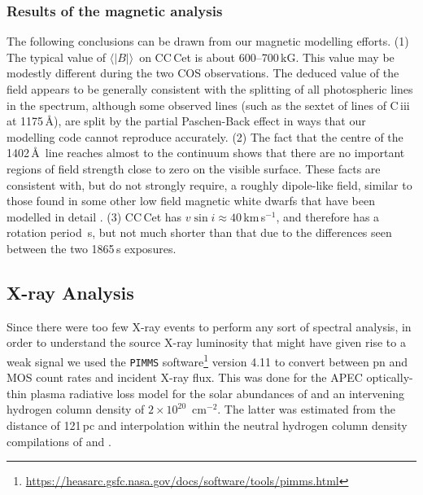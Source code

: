 \documentclass[fleqn,usenatbib]{mnras}
\newcommand{\bs}{\ensuremath{\langle \vert B \vert \rangle}}
\newcommand{\kms}{km\,s$^{-1}$}
\begin{document}
\subsubsection{Results of the magnetic analysis}

The following conclusions can be drawn from our magnetic modelling efforts. (1) The typical value of \bs\ on CC\,Cet is about 600--700\,kG. This value may be modestly different during the two COS observations. The deduced value of the field appears to be generally consistent with the splitting of all photospheric lines in the spectrum, although some observed lines (such as the sextet of lines of C\,{\sc iii} at 1175\,\AA), are split by the partial Paschen-Back effect in ways that our modelling code cannot reproduce accurately. (2) The fact that the centre of the 1402\,\AA\ line reaches almost to the continuum shows that there are no important regions of field strength close to zero on the visible surface. These facts are consistent with, but do not strongly require, a roughly dipole-like field, similar to those found in some other low field magnetic white dwarfs that have been modelled in detail \citep[e.g. WD\,2047+372: see][]{landstreetetal17-1}. (3) CC\,Cet has $v \sin i \approx 40$\,\kms, and therefore has a rotation period \,s, but not much shorter than that due to the differences seen between the two 1865\,s exposures. 









\subsection{X-ray Analysis}
\label{sec:x-rays}
Since there were too few X-ray events to perform any sort of spectral analysis, in order to understand the source X-ray luminosity that might have given rise to a weak signal we used the {\tt PIMMS} software\footnote{\url{https://heasarc.gsfc.nasa.gov/docs/software/tools/pimms.html}} version 4.11 to convert between pn and MOS count rates and incident X-ray flux. This was done for the APEC optically-thin plasma radiative loss model \citep{fosteretal12-1} for the solar abundances of \citet{asplundetal09-1} and an intervening hydrogen column density of $2\times 10^{20}$~cm$^{-2}$. The latter was estimated from the distance of 121\,pc  \citep{gaia18-1} and interpolation within the neutral hydrogen column density compilations of \citet{Linsky.etal:19} and \citet{Gudennavar.etal:12}.  
\end{document}
